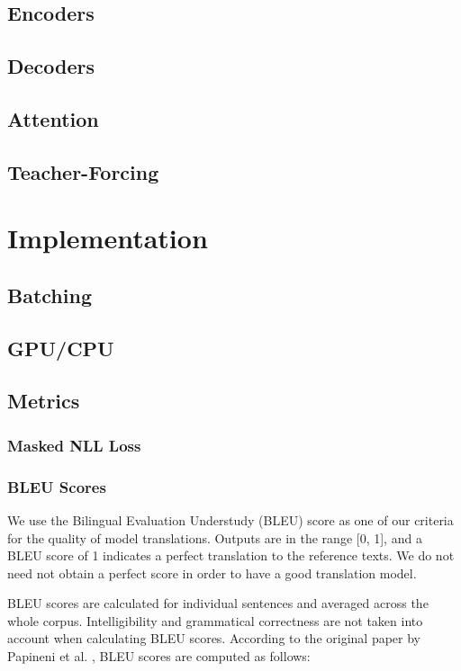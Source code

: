 \documentclass[twoside,twocolumn]{article}
\begin{document}
\subsection{Encoders}
\subsection{Decoders}
\subsection{Attention}
\subsection{Teacher-Forcing}
\section{Implementation}
\label{sec:implementation}
\subsection{Batching}
\subsection{GPU/CPU}
\subsection{Metrics}
\subsubsection{Masked NLL Loss}
\label{sec:masked-loss}
\subsubsection{BLEU Scores}
\label{sec:bleu}
We use the Bilingual Evaluation Understudy (BLEU) score as one of our criteria
for the quality of model translations. Outputs are in the range [0, 1], and a
BLEU score of 1 indicates a perfect translation to the reference texts.
We do not need not obtain a perfect score in order to have a good
translation model.

BLEU scores are calculated for individual sentences and averaged across the
whole corpus. Intelligibility and grammatical correctness are not taken into
account when calculating BLEU scores. According to the original paper by
Papineni et al. \cite{papineni2002bleu}, BLEU scores are computed as follows:
\end{document}
